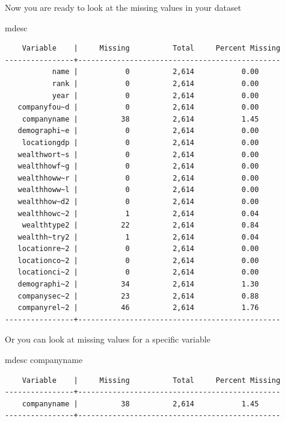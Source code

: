 \documentclass[
]{book}
\newenvironment{Shaded}{\begin{snugshade}}{\end{snugshade}}
\newcommand{\NormalTok}[1]{#1}
\begin{document}
Now you are ready to look at the missing values in your dataset

\begin{Shaded}
\begin{Highlighting}[]
\NormalTok{mdesc}
\end{Highlighting}
\end{Shaded}

\begin{verbatim}
    Variable    |     Missing          Total     Percent Missing
----------------+-----------------------------------------------
           name |           0          2,614           0.00
           rank |           0          2,614           0.00
           year |           0          2,614           0.00
   companyfou~d |           0          2,614           0.00
    companyname |          38          2,614           1.45
   demographi~e |           0          2,614           0.00
    locationgdp |           0          2,614           0.00
   wealthwort~s |           0          2,614           0.00
   wealthhowf~g |           0          2,614           0.00
   wealthhoww~r |           0          2,614           0.00
   wealthhoww~l |           0          2,614           0.00
   wealthhow~d2 |           0          2,614           0.00
   wealthhowc~2 |           1          2,614           0.04
    wealthtype2 |          22          2,614           0.84
   wealthh~try2 |           1          2,614           0.04
   locationre~2 |           0          2,614           0.00
   locationco~2 |           0          2,614           0.00
   locationci~2 |           0          2,614           0.00
   demographi~2 |          34          2,614           1.30
   companysec~2 |          23          2,614           0.88
   companyrel~2 |          46          2,614           1.76
----------------+-----------------------------------------------
\end{verbatim}

Or you can look at missing values for a specific variable

\begin{Shaded}
\begin{Highlighting}[]
\NormalTok{mdesc companyname}
\end{Highlighting}
\end{Shaded}

\begin{verbatim}
    Variable    |     Missing          Total     Percent Missing
----------------+-----------------------------------------------
    companyname |          38          2,614           1.45
----------------+-----------------------------------------------
\end{verbatim}
\end{document}
